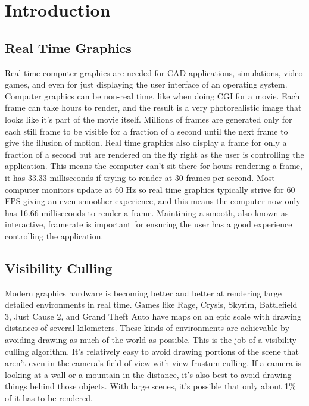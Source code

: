 \documentclass[12pt]{ucthesis}
\begin{document}
\pagestyle{plain}




\renewcommand{\baselinestretch}{1.66}







\chapter{Introduction}
\label{intro}

\section{Real Time Graphics}
\label{real-time-graphics}

Real time computer graphics are needed for CAD applications, simulations, video games, and even for just displaying the user interface of an operating system.
Computer graphics can be non-real time, like when doing CGI for a movie.
Each frame can take hours to render, and the result is a very photorealistic image that looks like it's part of the movie itself.
Millions of frames are generated only for each still frame to be visible for a fraction of a second until the next frame to give the illusion of motion.
Real time graphics also display a frame for only a fraction of a second but are rendered on the fly right as the user is controlling the application.
This means the computer can't sit there for hours rendering a frame, it has 33.33 milliseconds if trying to render at 30 frames per second.
Most computer monitors update at 60 Hz so real time graphics typically strive for 60 FPS giving an even smoother experience, and this means the computer now only has 16.66 milliseconds to render a frame.
Maintining a smooth, also known as interactive, framerate is important for ensuring the user has a good experience controlling the application.\cite{Interactive}

\section{Visibility Culling}
\label{visibility-culling}

Modern graphics hardware is becoming better and better at rendering large detailed environments in real time.
Games like Rage, Crysis, Skyrim, Battlefield 3, Just Cause 2, and Grand Theft Auto have maps on an epic scale with drawing distances of several kilometers.
These kinds of environments are achievable by avoiding drawing as much of the world as possible.\cite{heir-occ-map, large-occluders, Vis-Computations-Densely-Occluded, Portal-culling, Cryengine-culling-explained, Portals-mirrors, dpvs, cryengine3, culling-bf, CHC, CHCpp}
This is the job of a visibility culling algorithm.  It's relatively easy to avoid drawing portions of the scene that aren't even in the camera's field of view with view frustum culling.
If a camera is looking at a wall or a mountain in the distance, it's also best to avoid drawing things behind those objects.
With large scenes, it's possible that only about 1\% of it has to be rendered.
\end{document}
